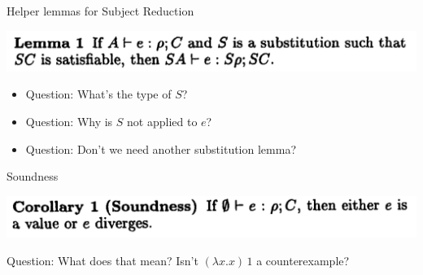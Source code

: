 \documentclass{beamer}
\begin{document}
\begin{frame}{Helper lemmas for Subject Reduction}

\includegraphics[scale=0.6]{paper_lemma_1.png}

\begin{itemize}
\item Question: What's the type of $S$?\\

\item Question: Why is $S$ not applied to $e$?\\

\item Question: Don't we need another substitution lemma?\\
\end{itemize}

\end{frame}

\begin{frame}{Soundness}

\includegraphics[scale=0.6]{paper_corollary_1.png}

Question: What does that mean? Isn't $(\lambda x.x)\,1$ a counterexample?


\end{frame}
\end{document}
